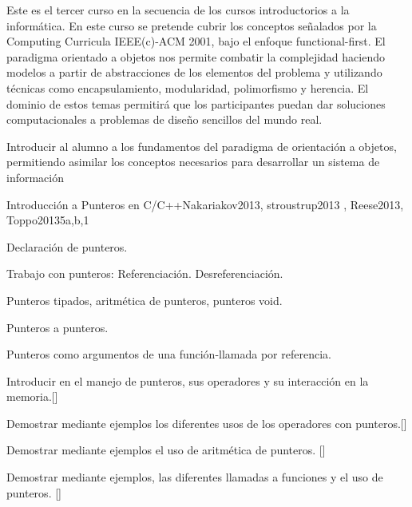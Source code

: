 \begin{syllabus}


\begin{justification}
Este es el tercer curso en la secuencia de los cursos introductorios a la informática. En este curso se pretende cubrir los
conceptos señalados por la Computing Curricula IEEE(c)-ACM 2001, bajo el enfoque functional-first.
El paradigma orientado a objetos nos permite combatir la complejidad haciendo modelos a partir de abstracciones
de los elementos del problema y utilizando técnicas como encapsulamiento, modularidad, polimorfismo y herencia. El
dominio de estos temas permitirá que los participantes puedan dar soluciones computacionales a problemas de diseño
sencillos del mundo real.
\end{justification}

\begin{goals}
\item Introducir al alumno a los fundamentos del paradigma de orientación a objetos, permitiendo asimilar los conceptos necesarios para desarrollar un sistema de información
\end{goals}



\begin{unit}{Introducción a Punteros en C/C++}{}{Nakariakov2013, stroustrup2013 , Reese2013, Toppo2013}{5}{a,b,1}
\begin{topics}
	\item Declaración de punteros.
	\item Trabajo con punteros:
	\subitem Referenciación.
	\subitem Desreferenciación.
	\item Punteros tipados, aritmética de punteros, punteros void.
	\item Punteros a punteros.
	\item Punteros como argumentos de una función-llamada por referencia.
\end{topics}

\begin{learningoutcomes}
	\item Introducir en el manejo de punteros, sus operadores y su interacción en la memoria.[\Usage]
	\item Demostrar mediante ejemplos los diferentes usos de los operadores con punteros.[\Usage]
	\item Demostrar mediante ejemplos el uso de aritmética de punteros. [\Usage]
	\item Demostrar mediante ejemplos, las diferentes llamadas a funciones y el uso de punteros. [\Usage]
\end{learningoutcomes}
\end{unit}


\end{syllabus}
